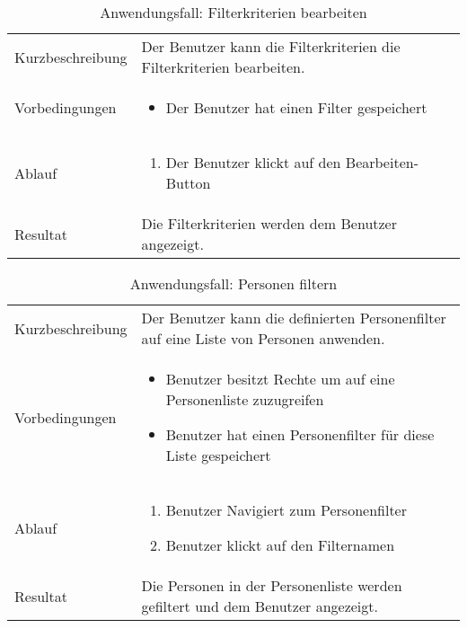 \newpage

\begin{table}[h!]
   \begin{tabular}{|L{0.3\textwidth}|L{0.6\textwidth}|}
      \hline
        \\[4pt]
      \hline
      Kurzbeschreibung & Der Benutzer kann die Filterkriterien die Filterkriterien bearbeiten. \\
      \hline
      Vorbedingungen & 
      \begin{itemize}
         \item Der Benutzer hat einen Filter gespeichert
      \end{itemize}  \\
      \hline
      Ablauf & \begin{enumerate}
      \item Der Benutzer klickt auf den Bearbeiten-Button
      \end{enumerate}  \\
      \hline
      Resultat & Die Filterkriterien werden dem Benutzer angezeigt. \\
      \hline
   \end{tabular}
   \caption{Anwendungsfall: Filterkriterien bearbeiten}
\end{table}

\begin{table}[h!]
   \begin{tabular}{|L{0.3\textwidth}|L{0.6\textwidth}|}
      \hline
        \\[4pt]
      \hline
      Kurzbeschreibung & Der Benutzer kann die definierten Personenfilter auf eine Liste von Personen 
      anwenden. \\
      \hline
      Vorbedingungen & \begin{itemize}
         \item Benutzer besitzt Rechte um auf eine Personenliste zuzugreifen
         \item Benutzer hat einen Personenfilter für diese Liste gespeichert
         \end{itemize}  \\
      \hline
      Ablauf & \begin{enumerate}
      \item Benutzer Navigiert zum Personenfilter
      \item Benutzer klickt auf den Filternamen
      \end{enumerate}  \\
      \hline
      Resultat & Die Personen in der Personenliste werden gefiltert und dem Benutzer angezeigt. \\
      \hline
   \end{tabular}
   \caption{Anwendungsfall: Personen filtern}
\end{table}

